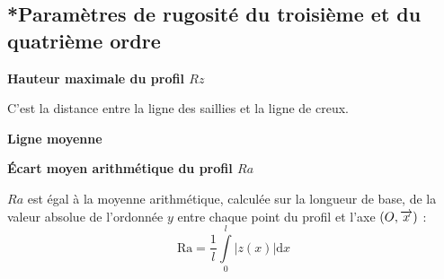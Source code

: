 \documentclass[10pt,fleqn]{article} %
\begin{document}
\begin{multicols}{2}
\subsection{*Paramètres de rugosité du troisième et du quatrième ordre}



\begin{defi}
\textbf{Hauteur maximale du profil $Rz$}

C'est la distance entre la ligne des saillies et la ligne de creux. 

\end{defi}

\begin{defi}
\textbf{Ligne moyenne}

\end{defi}

\begin{defi}
\textbf{Écart moyen arithmétique du profil $Ra$}

$Ra$ est égal à la moyenne arithmétique, calculée sur la longueur de base, de la valeur absolue de l'ordonnée $y$ entre chaque point du profil et l'axe $\left(O,\overrightarrow{x}\right)$ :
$$ \text{Ra} = \dfrac{1}{l}\int \limits_0^l \left| z(x)\right| \mathrm{d}x $$

\end{defi}

%
%
%
%
%
\end{multicols}
\end{document}
